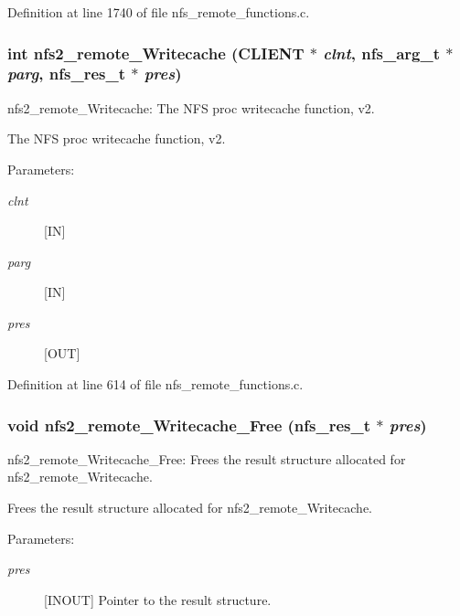 Definition at line 1740 of file nfs\_\-remote\_\-functions.c.
\subsubsection[{nfs2\_\-remote\_\-Writecache}]{\setlength{\rightskip}{0pt plus 5cm}int nfs2\_\-remote\_\-Writecache (CLIENT $\ast$ {\em clnt}, \/  nfs\_\-arg\_\-t $\ast$ {\em parg}, \/  nfs\_\-res\_\-t $\ast$ {\em pres})}\label{group__NFSprocs_gb226eed035dba6d1e2027b2bc082f9ef}


nfs2\_\-remote\_\-Writecache: The NFS proc writecache function, v2.

The NFS proc writecache function, v2.

\begin{Desc}
\item[Parameters:]
\begin{description}
\item[{\em clnt}][IN] \item[{\em parg}][IN] \item[{\em pres}][OUT] \end{description}
\end{Desc}


Definition at line 614 of file nfs\_\-remote\_\-functions.c.
\subsubsection[{nfs2\_\-remote\_\-Writecache\_\-Free}]{\setlength{\rightskip}{0pt plus 5cm}void nfs2\_\-remote\_\-Writecache\_\-Free (nfs\_\-res\_\-t $\ast$ {\em pres})}\label{group__NFSprocs_g21e909029d33f6170d14c16d19557aab}


nfs2\_\-remote\_\-Writecache\_\-Free: Frees the result structure allocated for nfs2\_\-remote\_\-Writecache.

Frees the result structure allocated for nfs2\_\-remote\_\-Writecache.

\begin{Desc}
\item[Parameters:]
\begin{description}
\item[{\em pres}][INOUT] Pointer to the result structure. \end{description}
\end{Desc}


